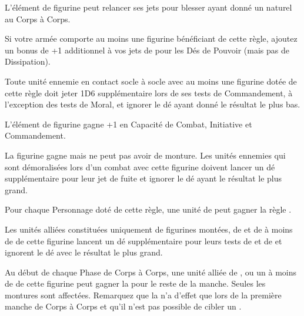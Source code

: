 

\startarmyspecialrules

\armyspecialruleentry{\killerinstinct}

L'élément de figurine peut relancer ses jets pour blesser ayant donné un  naturel au Corps à Corps.

\armyspecialruleentry{\masterofthedarkarts}

Si votre armée comporte au moins une figurine bénéficiant de cette règle, ajoutez un bonus de +1 additionnel à vos jets de \channel{} pour les Dés de Pouvoir (mais pas de Dissipation).

\armyspecialruleentry{\auraofdespair}

Toute unité ennemie en contact socle à socle avec au moins une figurine dotée de cette règle doit jeter 1D6 supplémentaire lors de ses tests de Commandement, à l'exception des tests de Moral, et ignorer le dé ayant donné le résultat le plus bas.

\armyspecialruleentry{\alphapredator}

L'élément de figurine gagne +1 en Capacité de Combat, Initiative et Commandement.

\begin{multicols}{2}\raggedcolumns
\armyspecialruleentry{\fleetcommander}

La figurine gagne  mais ne peut pas avoir de monture. Les unités ennemies qui sont démoralisées lors d'un combat avec cette figurine doivent lancer un dé supplémentaire pour leur jet de fuite et ignorer le dé ayant le résultat le plus grand.

Pour chaque Personnage doté de cette règle, une unité de \corsairs{} peut gagner la règle \vanguard{}.

\columnbreak
\armyspecialruleentry{\beastmaster}

Les unités alliées constituées uniquement de figurines montées, de \monsters{} et de \warbeasts{} à moins de  de cette figurine lancent un dé supplémentaire pour leurs tests de \frenzy{} et de \stupidity{} et ignorent le dé avec le résultat le plus grand.

Au début de chaque Phase de Corps à Corps, une unité alliée de \cavalry{}, \monstrouscavalry{} ou un \monster{} à moins de  de cette figurine peut gagner la \hatred{} pour le reste de la manche. Seules les montures sont affectées. Remarquez que la \hatred{} n'a d'effet que lors de la première manche de Corps à Corps et qu'il n'est pas possible de cibler un \riddenmonster{}.

\end{multicols}

